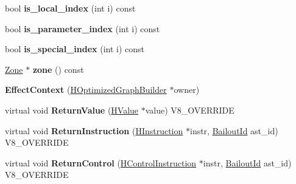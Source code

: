 \begin{DoxyCompactItemize}
\item 
\hypertarget{classv8_1_1internal_1_1_v8___f_i_n_a_l_ac9c85af866ae76a81b54e30f89dc03eb}{}bool {\bfseries is\+\_\+local\+\_\+index} (int i) const \label{classv8_1_1internal_1_1_v8___f_i_n_a_l_ac9c85af866ae76a81b54e30f89dc03eb}

\item 
\hypertarget{classv8_1_1internal_1_1_v8___f_i_n_a_l_a3e652dcc173e804c5326d890ce074277}{}bool {\bfseries is\+\_\+parameter\+\_\+index} (int i) const \label{classv8_1_1internal_1_1_v8___f_i_n_a_l_a3e652dcc173e804c5326d890ce074277}

\item 
\hypertarget{classv8_1_1internal_1_1_v8___f_i_n_a_l_a9ac5e83e246ec1ad90b5a8ddd649a1f5}{}bool {\bfseries is\+\_\+special\+\_\+index} (int i) const \label{classv8_1_1internal_1_1_v8___f_i_n_a_l_a9ac5e83e246ec1ad90b5a8ddd649a1f5}

\item 
\hypertarget{classv8_1_1internal_1_1_v8___f_i_n_a_l_a9dd2b3775a31619fcd5f9a26ba08d1d6}{}\hyperlink{classv8_1_1internal_1_1_zone}{Zone} $\ast$ {\bfseries zone} () const \label{classv8_1_1internal_1_1_v8___f_i_n_a_l_a9dd2b3775a31619fcd5f9a26ba08d1d6}

\item 
\hypertarget{classv8_1_1internal_1_1_v8___f_i_n_a_l_a6c4623e32ddde2ca9421634000099b6d}{}{\bfseries Effect\+Context} (\hyperlink{classv8_1_1internal_1_1_h_optimized_graph_builder}{H\+Optimized\+Graph\+Builder} $\ast$owner)\label{classv8_1_1internal_1_1_v8___f_i_n_a_l_a6c4623e32ddde2ca9421634000099b6d}

\item 
\hypertarget{classv8_1_1internal_1_1_v8___f_i_n_a_l_a786f6c33e41273e0430caf595a86029b}{}virtual void {\bfseries Return\+Value} (\hyperlink{classv8_1_1internal_1_1_h_value}{H\+Value} $\ast$value) V8\+\_\+\+O\+V\+E\+R\+R\+I\+D\+E\label{classv8_1_1internal_1_1_v8___f_i_n_a_l_a786f6c33e41273e0430caf595a86029b}

\item 
\hypertarget{classv8_1_1internal_1_1_v8___f_i_n_a_l_adde278b58415cb2d35bacc91538f0894}{}virtual void {\bfseries Return\+Instruction} (\hyperlink{classv8_1_1internal_1_1_h_instruction}{H\+Instruction} $\ast$instr, \hyperlink{classv8_1_1internal_1_1_bailout_id}{Bailout\+Id} ast\+\_\+id) V8\+\_\+\+O\+V\+E\+R\+R\+I\+D\+E\label{classv8_1_1internal_1_1_v8___f_i_n_a_l_adde278b58415cb2d35bacc91538f0894}

\item 
\hypertarget{classv8_1_1internal_1_1_v8___f_i_n_a_l_a87e4ffd42f8a26a5da6cc93125d6a804}{}virtual void {\bfseries Return\+Control} (\hyperlink{classv8_1_1internal_1_1_h_control_instruction}{H\+Control\+Instruction} $\ast$instr, \hyperlink{classv8_1_1internal_1_1_bailout_id}{Bailout\+Id} ast\+\_\+id) V8\+\_\+\+O\+V\+E\+R\+R\+I\+D\+E\label{classv8_1_1internal_1_1_v8___f_i_n_a_l_a87e4ffd42f8a26a5da6cc93125d6a804}


\end{DoxyCompactItemize}
